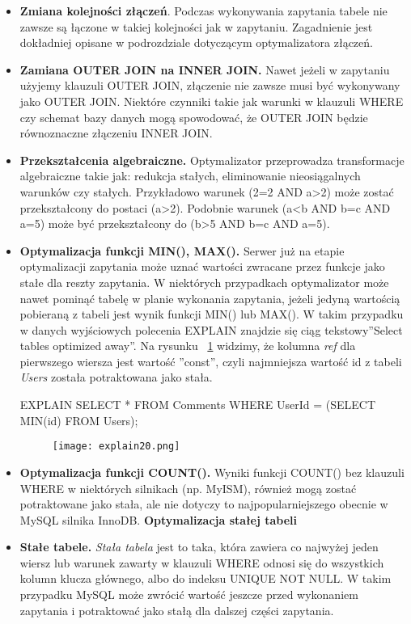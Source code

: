 \begin{itemize}
	\item \textbf{Zmiana kolejności złączeń}. Podczas wykonywania zapytania tabele nie zawsze są łączone w takiej kolejności jak w zapytaniu. Zagadnienie jest dokładniej opisane w podrozdziale dotyczącym optymalizatora złączeń.
	\item \textbf{Zamiana OUTER JOIN na INNER JOIN.} Nawet jeżeli w zapytaniu użyjemy klauzuli OUTER JOIN, złączenie nie zawsze musi być wykonywany jako OUTER JOIN. Niektóre czynniki takie jak warunki w klauzuli WHERE czy schemat bazy danych mogą spowodować, że OUTER JOIN będzie równoznaczne złączeniu INNER JOIN. 
	\item \textbf{Przekształcenia algebraiczne.} Optymalizator przeprowadza transformacje algebraiczne takie jak: redukcja stałych, eliminowanie nieosiągalnych warunków czy stałych. Przykładowo warunek (2=2 AND a>2) może zostać przekształcony do postaci (a>2). Podobnie warunek (a<b AND b=c AND a=5) może być przekształcony do (b>5 AND b=c AND a=5).
	\item \textbf{Optymalizacja funkcji MIN(), MAX().}
	Serwer już na etapie optymalizacji zapytania może uznać wartości zwracane przez funkcje jako stałe dla reszty zapytania. W niektórych przypadkach optymalizator może nawet pominąć tabelę w planie wykonania zapytania, jeżeli jedyną wartością pobieraną z tabeli jest wynik funkcji MIN() lub MAX(). W takim przypadku w danych wyjściowych polecenia EXPLAIN znajdzie się ciąg tekstowy''Select tables optimized away''.
	Na rysunku ~\ref{fig:explain20} widzimy, że kolumna \textit{ref} dla pierwszego wiersza jest wartość ''const'', czyli najmniejsza wartość id z tabeli \textit{Users} została potraktowana jako stała.
	\begin{spverbatim}
		EXPLAIN SELECT * FROM Comments WHERE UserId = (SELECT MIN(id) FROM Users);
	\end{spverbatim}
\begin{figure}
	\centering
	\texttt{[image: explain20.png]}
	\label{fig:explain20}
\end{figure}
	\item \textbf{Optymalizacja funkcji COUNT().} Wyniki funkcji COUNT() bez klauzuli WHERE w niektórych silnikach (np. MyISM), również mogą zostać potraktowane jako stała, ale nie dotyczy to najpopularniejszego obecnie w MySQL silnika InnoDB.
	\textbf{Optymalizacja stałej tabeli}
	
	\item \textbf{Stałe tabele.} \textit{Stała tabela} jest to taka, która zawiera co najwyżej jeden wiersz lub warunek zawarty w klauzuli WHERE odnosi się do wszystkich kolumn klucza głównego, albo do indeksu UNIQUE NOT NULL. W takim przypadku MySQL może zwrócić wartość jeszcze przed wykonaniem zapytania i potraktować jako stałą dla dalszej części zapytania.
\end{itemize}

